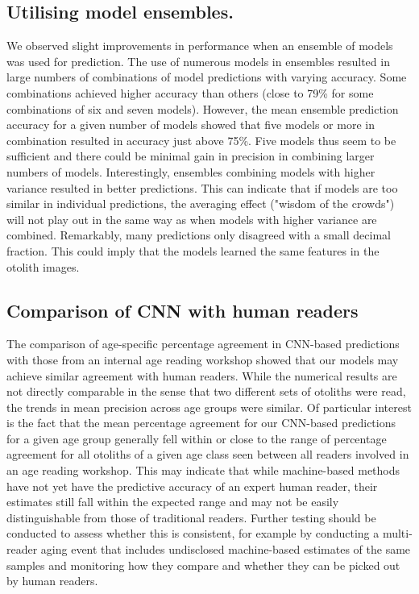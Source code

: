 \documentclass[10pt,letterpaper]{article}
\begin{document}
\subsection{Utilising model ensembles.}
We observed slight improvements in performance when an ensemble of models was used for prediction. The use of numerous models in ensembles resulted in large numbers of combinations of model predictions with varying accuracy. Some combinations achieved higher accuracy than others (close to 79\% for some combinations of six and seven models). However, the mean ensemble prediction accuracy for a given number of models showed that five models or more in combination resulted in accuracy just above 75\%. Five models thus seem to be sufficient and there could be minimal gain in precision in combining larger numbers of models. Interestingly, ensembles combining models with higher variance resulted in better predictions. This can indicate that if models are too similar in individual predictions, the averaging effect ("wisdom of the crowds") will not play out in the same way as when models with higher variance are combined. Remarkably, many predictions only disagreed with a small decimal fraction. This could imply that the models learned the same features in the otolith images.

\subsection{Comparison of CNN with human readers}
The comparison of age-specific percentage agreement in CNN-based predictions with those from an internal age reading workshop showed that our models may achieve similar agreement with human readers. While the numerical results are not directly comparable in the sense that two different sets of otoliths were read, the trends in mean precision across age groups were similar. 
Of particular interest is the fact that the mean percentage agreement for our CNN-based predictions for a given age group generally fell within or close to the range of percentage agreement for all otoliths of a given age class seen between all readers involved in an age reading workshop. This may indicate that while machine-based methods have not yet have the predictive accuracy of an expert human reader, their estimates still fall within the expected range and may not be easily distinguishable from those of traditional readers. Further testing should be conducted to assess whether this is consistent, for example by conducting a multi-reader aging event that includes undisclosed machine-based estimates of the same samples and monitoring how they compare and whether they can be picked out by human readers. 
\end{document}
